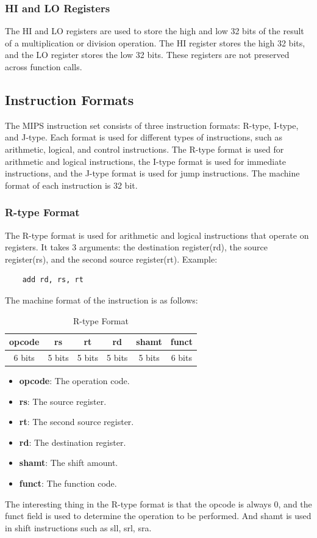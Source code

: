 \subsubsection{HI and LO Registers}
The HI and LO registers are used to store the high and low 32 bits of the result of a multiplication or division operation. The HI register stores the high 32 bits, and the LO register stores the low 32 bits. These registers are not preserved across function calls.

\subsection{Instruction Formats}
The MIPS instruction set consists of three instruction formats: R-type, I-type, and J-type. Each format is used for different types of instructions, such as arithmetic, logical, and control instructions. The R-type format is used for arithmetic and logical instructions, the I-type format is used for immediate instructions, and the J-type format is used for jump instructions. The machine format of each instruction is 32 bit.


\subsubsection{R-type Format}
The R-type format is used for arithmetic and logical instructions that operate on registers. It takes 3 arguments: the destination register(rd), the source register(rs), and the second source register(rt). Example:
\begin{verbatim}
    add rd, rs, rt
\end{verbatim}

The machine format of the instruction is as follows:
\begin{table}[H]
    \centering
    \begin{tabular}{|c|c|c|c|c|c|}
    \hline
    \textbf{opcode} & \textbf{rs} & \textbf{rt} & \textbf{rd} & \textbf{shamt} & \textbf{funct} \\ \hline
    6 bits         & 5 bits     & 5 bits     & 5 bits     & 5 bits        & 6 bits        \\ \hline
    \end{tabular}
    \caption{R-type Format}
    \label{tab:r_type_format}
\end{table}
\begin{itemize}
    \item \textbf{opcode}: The operation code.
    \item \textbf{rs}: The source register.
    \item \textbf{rt}: The second source register.
    \item \textbf{rd}: The destination register.
    \item \textbf{shamt}: The shift amount.
    \item \textbf{funct}: The function code.
\end{itemize}
The interesting thing in the R-type format is that the opcode is always 0, and the funct field is used to determine the operation to be performed. And shamt is used in shift instructions such as sll, srl, sra.

